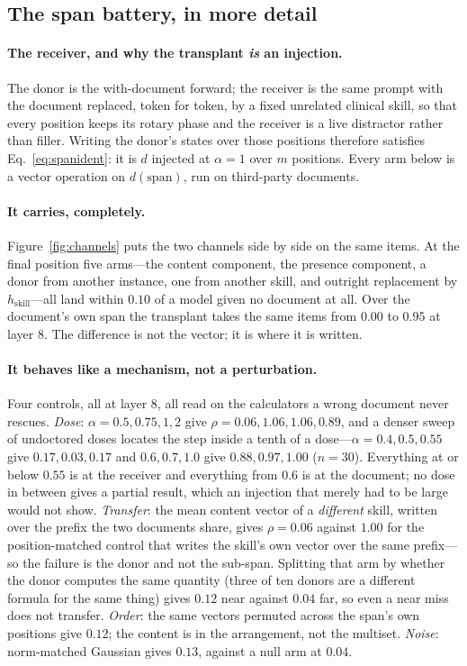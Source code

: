 \documentclass{article}
\newcommand{\dvec}{\ensuremath{d}}
\begin{document}
\subsection{The span battery, in more detail}
\label{app:battery2}

\paragraph{The receiver, and why the transplant \emph{is} an injection.} The
donor is the with-document forward; the receiver is the same prompt with the
document replaced, token for token, by a fixed unrelated clinical skill, so that
every position keeps its rotary phase and the receiver is a live distractor
rather than filler. Writing the donor's states over those positions therefore
satisfies Eq.~\ref{eq:spanident}: it is $\dvec$ injected at $\alpha=1$ over $m$
positions. Every arm below is a vector operation on $\dvec(\text{span})$, run on
third-party documents.

\paragraph{It carries, completely.} Figure~\ref{fig:channels} puts the two
channels side by side on the same items. At the final position five arms---the
content component, the presence component, a donor from another instance, one
from another skill, and outright replacement by $h_{\text{skill}}$---all land
within $0.10$ of a model given no document at all. Over the document's own span
the transplant takes the same items from $0.00$ to $0.95$ at layer $8$. The
difference is not the vector; it is where it is written.



\paragraph{It behaves like a mechanism, not a perturbation.} Four controls, all
at layer 8, all read on the calculators a wrong document never rescues.
\emph{Dose}: $\alpha = 0.5, 0.75, 1, 2$ give $\rho = 0.06, 1.06, 1.06, 0.89$,
and a denser sweep of undoctored doses locates the step inside a tenth of a
dose---$\alpha = 0.4, 0.5, 0.55$ give $0.17, 0.03, 0.17$ and $0.6, 0.7, 1.0$
give $0.88, 0.97, 1.00$ ($n=30$). Everything at or below $0.55$ is at the
receiver and everything from $0.6$ is at the document; no dose in between gives
a partial result, which an injection that merely had to be large would not show.
\emph{Transfer}: the mean content vector of a \emph{different} skill, written
over the prefix the two documents share, gives $\rho = 0.06$ against $1.00$ for
the position-matched control that writes the skill's own vector over the same
prefix---so the failure is the donor and not the sub-span. Splitting that arm by
whether the donor computes the same quantity (three of ten donors are a
different formula for the same thing) gives $0.12$ near against $0.04$ far, so
even a near miss does not transfer. \emph{Order}: the same vectors permuted
across the span's own positions give $0.12$; the content is in the arrangement,
not the multiset. \emph{Noise}: norm-matched Gaussian gives $0.13$, against a
null arm at $0.04$.
\end{document}

